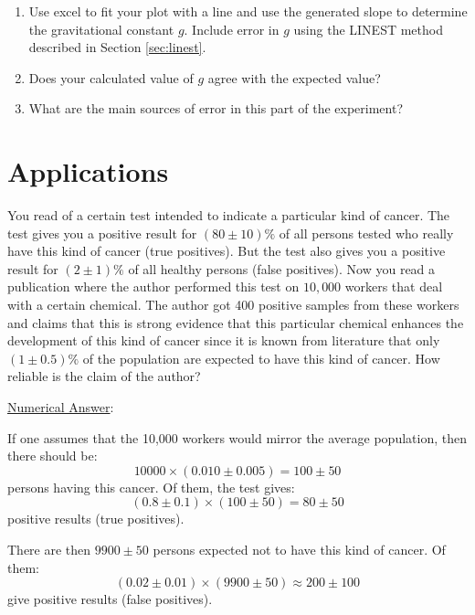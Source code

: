 \begin{itemize}
\begin{enumerate}
\item Use excel to fit your plot with a line and use the generated slope to determine the gravitational constant $g$. Include error in $g$ using the LINEST method described in Section \ref{sec:linest}.
\item Does your calculated value of $g$ agree with the expected value?
\item What are the main sources of error in this part of the experiment?
\end{enumerate}
\end{itemize}

\newpage
\section{Applications}
You read of a certain test intended to indicate a particular kind of cancer. The test gives you a positive result for $(80 \pm 10) \%$ of all persons tested who really have this kind of cancer (true positives). But the test also gives you a positive result for $(2 \pm 1) \%$ of all healthy persons (false positives). Now you read a publication where the author performed this test on $10,000$ workers that deal with a certain chemical. The author got 400 positive samples from these workers and claims that this is strong evidence that this particular chemical enhances the development of this kind of cancer since it is known from literature that only $(1 \pm 0.5)\%$ of the population are expected to have this kind of cancer. How reliable is the claim of the author?\myskip

\noindent \underline{Numerical Answer}:

If one assumes that the 10,000 workers would mirror the average population, then there should be:
\begin{equation}
    10000 \times (0.010 \pm 0.005) = 100 \pm 50
\end{equation}
persons having this cancer. Of them, the test gives:
\begin{equation}
    (0.8 \pm 0.1) \times (100 \pm 50) = 80 \pm 50
\end{equation}
positive results (true positives).\myskip

There are then $9900 \pm 50$ persons expected not to have this kind of cancer. Of them:
\begin{equation}
    (0.02 \pm 0.01) \times (9900 \pm 50) \approx 200 \pm 100
\end{equation}
give positive results (false positives).\myskip

